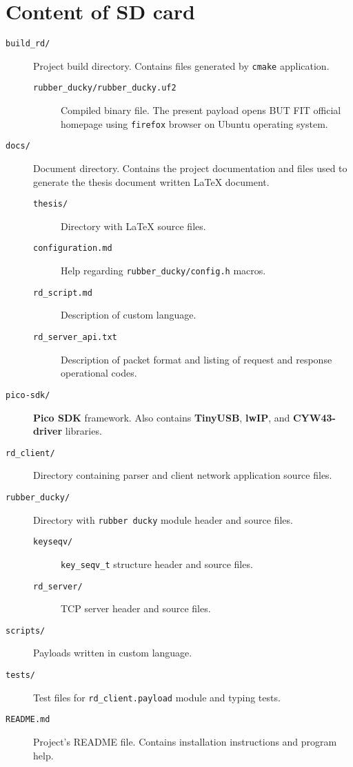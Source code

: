 \chapter{Content of SD card}

\begin{description}
    \item[\texttt{build\_rd/}] Project build directory. Contains files generated by \verb|cmake| application.
        \begin{description}
            \item[\texttt{rubber\_ducky/rubber\_ducky.uf2}] Compiled binary file. The present payload opens BUT FIT official homepage using \verb|firefox| browser on Ubuntu operating system.
        \end{description}
    \item[\texttt{docs/}] Document directory. Contains the project documentation and files used to generate the thesis document written \LaTeX{} document.
        \begin{description}
            \item[\texttt{thesis/}] Directory with \LaTeX{} source files.
            \item[\texttt{configuration.md}] Help regarding \verb|rubber_ducky/config.h| macros.
            \item[\texttt{rd\_script.md}] Description of custom language.
            \item[\texttt{rd\_server\_api.txt}] Description of packet format and listing of request and response operational codes.
        \end{description}
    \item[\texttt{pico-sdk/}] \textbf{Pico SDK} framework. Also contains \textbf{TinyUSB}, \textbf{lwIP}, and \textbf{CYW43-driver} libraries.
    \item[\texttt{rd\_client/}] Directory containing parser and client network application source files.
    \item[\texttt{rubber\_ducky/}] Directory with \verb|rubber ducky| module header and source files.
        \begin{description}
            \item[\texttt{keyseqv/}] \verb|key_seqv_t| structure header and source files.
            \item[\texttt{rd\_server/}] TCP server header and source files.
        \end{description}
    \item[\texttt{scripts/}] Payloads written in custom language.
    \item[\texttt{tests/}] Test files for \verb|rd_client.payload| module and typing tests.
    \item[\texttt{README.md}] Project's README file. Contains installation instructions and program help.
\end{description}
